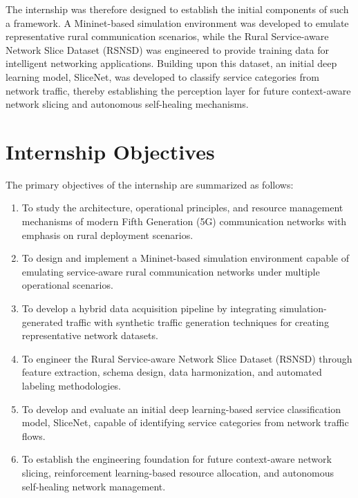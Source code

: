 \documentclass[12pt,a4paper]{report}
\begin{document}
	The internship was therefore designed to establish the initial components of such a framework. A Mininet-based simulation environment was developed to emulate representative rural communication scenarios, while the Rural Service-aware Network Slice Dataset (RSNSD) was engineered to provide training data for intelligent networking applications. Building upon this dataset, an initial deep learning model, SliceNet, was developed to classify service categories from network traffic, thereby establishing the perception layer for future context-aware network slicing and autonomous self-healing mechanisms.
	
	\section{Internship Objectives}
	\label{sec:objectives}
	
	The primary objectives of the internship are summarized as follows:
	
	\begin{enumerate}
		
		\item To study the architecture, operational principles, and resource management mechanisms of modern Fifth Generation (5G) communication networks with emphasis on rural deployment scenarios.
		
		\item To design and implement a Mininet-based simulation environment capable of emulating service-aware rural communication networks under multiple operational scenarios.
		
		\item To develop a hybrid data acquisition pipeline by integrating simulation-generated traffic with synthetic traffic generation techniques for creating representative network datasets.
		
		\item To engineer the Rural Service-aware Network Slice Dataset (RSNSD) through feature extraction, schema design, data harmonization, and automated labeling methodologies.
		
		\item To develop and evaluate an initial deep learning-based service classification model, SliceNet, capable of identifying service categories from network traffic flows.
		
		\item To establish the engineering foundation for future context-aware network slicing, reinforcement learning-based resource allocation, and autonomous self-healing network management.
		
	\end{enumerate}
	
\end{document}
